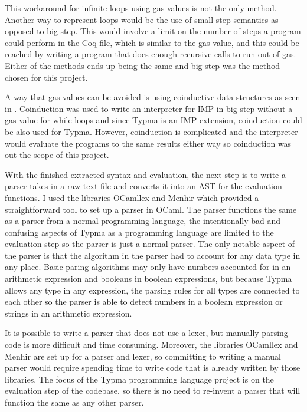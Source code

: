 \documentclass[10pt,twocolumn]{article}
\begin{document}
This workaround for infinite loops using gas values is not the only method. Another way to represent loops would be the use of small step semantics as opposed to big step. This would involve a limit on the number of steps a program could perform in the Coq file, which is similar to the gas value, and this could be reached by writing a program that does enough recursive calls to run out of gas. Either of the methods ends up being the same and big step was the method chosen for this project.

A way that gas values can be avoided is using coinductive data structures as seen in \textcite{Xia_2020}. Coinduction was used to write an interpreter for IMP in big step without a gas value for while loops and since Typma is an IMP extension, coinduction could be also used for Typma. However, coinduction is complicated and the interpreter would evaluate the programs to the same results either way so coinduction was out the scope of this project.

With the finished extracted syntax and evaluation, the next step is to write a parser takes in a raw text file and converts it into an AST for the evaluation functions. I used the libraries OCamllex and Menhir which provided a straightforward tool to set up a parser in OCaml. The parser functions the same as a parser from a normal programming language, the intentionally bad and confusing aspects of Typma as a programming language are limited to the evaluation step so the parser is just a normal parser. The only notable aspect of the parser is that the algorithm in the parser had to account for any data type in any place. Basic paring algorithms may only have numbers accounted for in an arithmetic expression and booleans in boolean expressions, but because Typma allows any type in any expression, the parsing rules for all types are connected to each other so the parser is able to detect numbers in a boolean expression or strings in an arithmetic expression.

It is possible to write a parser that does not use a lexer, but manually parsing code is more difficult and time consuming. Moreover, the libraries OCamllex and Menhir are set up for a parser and lexer, so committing to writing a manual parser would require spending time to write code that is already written by those libraries. The focus of the Typma programming language project is on the evaluation step of the codebase, so there is no need to re-invent a parser that will function the same as any other parser.
\end{document}
